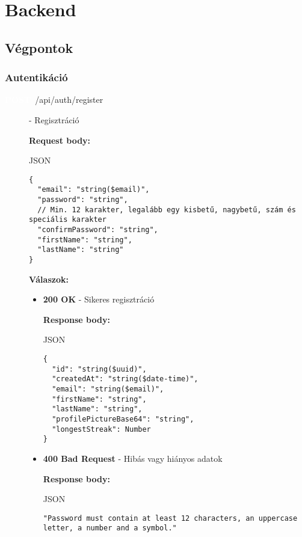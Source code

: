 \documentclass[12pt]{report}
\newcommand{\httpPost}[1]{\colorbox{postColor}{\textbf{\textcolor{white}{POST}}}~#1}
\begin{document}
\chapter{Backend}

\section{Végpontok}

\vspace{0.5cm}
\subsection{Autentikáció}
\begin{description}

  \item [\httpPost{/api/auth/register}] - Regisztráció
  
    \vspace{0.5cm}
    \textbf{Request body:}
    \begin{codeblock}{JSON}
      \begin{verbatim}
{
  "email": "string($email)",
  "password": "string",
  // Min. 12 karakter, legalább egy kisbetű, nagybetű, szám és speciális karakter
  "confirmPassword": "string",
  "firstName": "string",
  "lastName": "string"
}
      \end{verbatim}
    \end{codeblock}

    \vspace{0.5cm}
    \textbf{Válaszok:}
    \begin{itemize}
      \item \textbf{200 OK} - Sikeres regisztráció
      
        \textbf{Response body:}
        \begin{codeblock}{JSON}
          \begin{verbatim}
{
  "id": "string($uuid)",
  "createdAt": "string($date-time)",
  "email": "string($email)",
  "firstName": "string",
  "lastName": "string",
  "profilePictureBase64": "string",
  "longestStreak": Number
}
          \end{verbatim}
        \end{codeblock}

      \item \textbf{400 Bad Request} - Hibás vagy hiányos adatok
      
        \textbf{Response body:}
        \begin{codeblock}{JSON}
          \begin{verbatim}
"Password must contain at least 12 characters, an uppercase letter, a number and a symbol."
          \end{verbatim}
        \end{codeblock}


\end{itemize}
\end{description}
\end{document}
